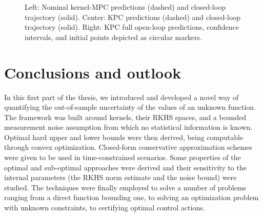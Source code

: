 \begin{figure}[t]
	\caption{Left: Nominal kernel-MPC predictions (dashed) and closed-loop trajectory (solid). Center: KPC predictions (dashed) and closed-loop trajectory (solid). Right: KPC full open-loop predictions, confidence intervals, and initial points depicted as circular markers. %
	}
	\label{fig.PENDULUM}
\end{figure}
	

\section{Conclusions and outlook}

In this first part of the thesis, we introduced and developed a novel way of quantifying the out-of-sample uncertainty of the values of an unknown function. The framework was built around kernels, their RKHS spaces, and a bounded measurement noise assumption from which no statistical information is known. Optimal hard upper and lower bounds were then derived, being computable through convex optimization. Closed-form conservative approximation schemes were given to be used in time-constrained scenarios. Some properties of the optimal and sub-optimal approaches were derived and their sensitivity to the internal parameters (the RKHS norm estimate and the noise bound) were studied. The techniques were finally employed to solve a number of problems ranging from a direct function bounding one, to solving an optimization problem with unknown constraints, to certifying optimal control actions.

